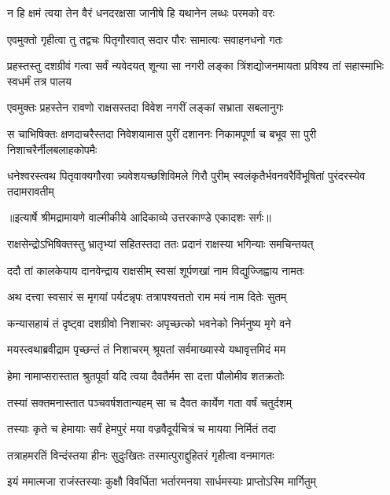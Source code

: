 \twolineshloka
{न हि क्षमं त्वया तेन वैरं धनदरक्षसा}
{जानीषे हि यथानेन लब्धः परमको वरः} %

\twolineshloka
{एवमुक्तो गृहीत्वा तु तद्वचः पितृगौरवात्}
{सदार पौरः सामात्यः सवाहनधनो गतः} %

\threelineshloka
{प्रहस्तस्तु दशग्रीवं गत्वा सर्वं न्यवेदयत्}
{शून्या सा नगरी लङ्का त्रिंशद्योजनमायता}
{प्रविश्य तां सहास्माभिः स्वधर्मं तत्र पालय} %

\twolineshloka
{एवमुक्तः प्रहस्तेन रावणो राक्षसस्तदा}
{विवेश नगरीं लङ्कां सभ्राता सबलानुगः} %

\fourlineindentedshloka
{स चाभिषिक्तः क्षणदाचरैस्तदा}
{ निवेशयामास पुरीं दशाननः}
{निकामपूर्णा च बभूव सा पुरी}
{ निशाचरैर्नीलबलाहकोपमैः} %

\fourlineindentedshloka
{धनेश्वरस्त्वथ पितृवाक्यगौरवा}
{न्न्यवेशयच्छशिविमले गिरौ पुरीम्}
{स्वलंकृतैर्भवनवरैर्विभूषितां}
{ पुरंदरस्येव तदामरावतीम्} %


{॥इत्यार्षे श्रीमद्रामायणे वाल्मीकीये आदिकाव्ये उत्तरकाण्डे एकादशः सर्गः॥}


\twolineshloka
{राक्षसेन्द्रोऽभिषिक्तस्तु भ्रातृभ्यां सहितस्तदा}
{ततः प्रदानं राक्षस्या भगिन्याः समचिन्तयत्} %

\twolineshloka
{ददौ तां कालकेयाय दानवेन्द्राय राक्षसीम्}
{स्वसां शूर्पणखां नाम विद्युज्जिह्वाय नामतः} %

\twolineshloka
{अथ दत्त्वा स्वसारं स मृगयां पर्यटन्नृपः}
{तत्रापश्यत्ततो राम मयं नाम दितेः सुतम्} %

\twolineshloka
{कन्यासहायं तं दृष्ट्वा दशग्रीवो निशाचरः}
{अपृच्छत्को भवनेको निर्मनुष्य मृगे वने} %

\twolineshloka
{मयस्त्वथाब्रवीद्राम पृच्छन्तं तं निशाचरम्}
{श्रूयतां सर्वमाख्यास्ये यथावृत्तमिदं मम} %

\twolineshloka
{हेमा नामाप्सरास्तात श्रुतपूर्वा यदि त्वया}
{दैवतैर्मम सा दत्ता पौलोमीव शतक्रतोः} %

\twolineshloka
{तस्यां सक्तमनास्तात पञ्चवर्षशतान्यहम्}
{सा च दैवत कार्येण गता वर्षं चतुर्दशम्} %

\twolineshloka
{तस्याः कृते च हेमायाः सर्वं हेमपुरं मया}
{वज्रवैदूर्यचित्रं च मायया निर्मितं तदा} %

\twolineshloka
{तत्राहमरतिं विन्दंस्तया हीनः सुदुःखितः}
{तस्मात्पुराद्दुहितरं गृहीत्वा वनमागतः} %

\twolineshloka
{इयं ममात्मजा राजंस्तस्याः कुक्षौ विवर्धिता}
{भर्तारमनया सार्धमस्याः प्राप्तोऽस्मि मार्गितुम्} %

